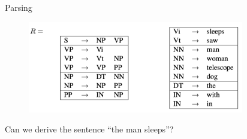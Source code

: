 \documentclass[usenames,dvipsnames,notes,11pt,aspectratio=169]{beamer}
\begin{document}
\begin{frame}
    {Parsing}
    \begin{figure}    
        \includegraphics[height=4cm]{figures/toy-cfg-2.png}
    \end{figure}  
    \vspace{-2em}
    Can we derive the sentence ``the man sleeps''?
    \vspace{9em}
\end{frame}
\end{document}
